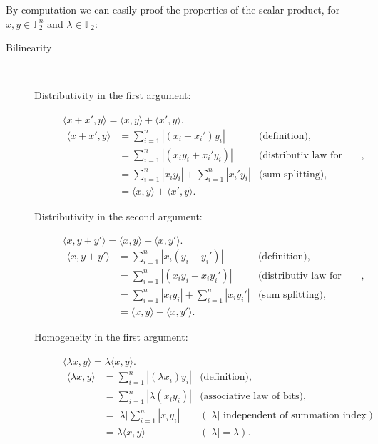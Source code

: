 \documentclass[a4paper]{article}
\newcommand{\BF}{\mathbb{F}}
\newcommand{\0}{\mathbf{0}}
\newcommand{\1}{\mathbf{1}}
\begin{document}
By computation we can easily proof the properties of the scalar product, for $x, y \in \BF_2^n$ and $\lambda \in \BF_2$:
\begin{description}
\item[Bilinearity] \
\begin{description}
\item[Distributivity in the first argument:]
$\langle x + x', y \rangle = \langle x, y \rangle + \langle x', y \rangle$.
\begin{equation*}
\begin{array}{rlr}
	\langle x+x',y\rangle & =\sum _{i=1}^{n}|(x_i+x_i')y_i| & \text{(definition)}, \\
	&=\sum _{i=1}^{n} |(x_i y_i + x_i' y_i)| & \text{(distributiv law for bits)}, \\
	&=\sum _{i=1}^{n} |x_i y_i| + \sum_{i=1}^{n} |x_i' y_i| & \text{(sum splitting)},\\
	&=\langle x,y\rangle +\langle x',y\rangle.
\end{array}
\end{equation*}
\item[Distributivity in the second argument:]
$\langle x, y + y' \rangle = \langle x, y \rangle + \langle x, y' \rangle$.
\begin{equation*}
\begin{array}{rlr}
\langle x,y+y' \rangle & =\sum _{i=1}^{n}|x_i (y_i + y_i')|  & \text{(definition)}, \\
	&=\sum _{i=1}^{n} |(x_i y_i + x_i y_i')| & \text{(distributiv law for bits)}, \\
	&=\sum _{i=1}^{n} |x_i y_i| + \sum_{i=1}^{n} |x_i y_i'| & \text{(sum splitting)}, \\
	&=\langle x,y\rangle +\langle x,y'\rangle.
\end{array}
\end{equation*}
\item[Homogeneity in the first argument:]
\(\langle \lambda x, y \rangle = \lambda \langle x, y \rangle\).
\begin{equation*}
\begin{array}{rlr}
	\langle \lambda x,y\rangle & =\sum _{i=1}^{n} | (\lambda x_i) y_i |  & \text{(definition)}, \\
	& =\sum _{i=1}^{n} | \lambda (x_i y_i) | & \text{(associative law of bits)}, \\
	& =|\lambda| \sum _{i=1}^{n} |x_i y_i | & (|\lambda| \text{ independent of summation index}), \\
	& = \lambda \langle x,y \rangle & (|\lambda| = \lambda).

\end{array}
\end{equation*}
\end{description}
\end{description}
\end{document}
